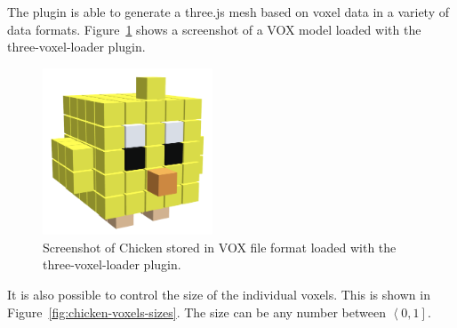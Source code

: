 The plugin is able to generate a three.js mesh based on voxel data in a variety of data formats. Figure~\ref{fig:three-voxel-loader} shows a screenshot of a VOX model loaded with the three-voxel-loader plugin.
\begin{figure}[htp]
    \centering
    \includegraphics[width=0.45\textwidth]{sections/result/figures/chicken-voxels.png}
    \caption{Screenshot of Chicken stored in VOX file format loaded with the three-voxel-loader plugin.}
    \label{fig:three-voxel-loader}
\end{figure}
It is also possible to control the size of the individual voxels. This is shown in Figure~\ref{fig:chicken-voxels-sizes}. The size can be any number between $\left<0, 1\right]$.
